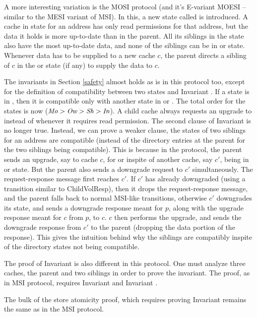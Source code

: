 A more interesting variation is the MOSI protocol (and it's E-variant MOESI --
similar to the MESI variant of MSI). In this, a new state called \Ow{} is
introduced. A cache in \Ow{} state for an address has only read permissions for
that address, but the data it holds is more up-to-date than in the parent.
All its siblings in the \Sh{} state also have the most up-to-date data, and
none of the siblings can be in \Mo{} or \Ow{} state.
Whenever data has to be supplied to a new cache $c$, the parent directs a
sibling of $c$ in the \Ow{} or \Mo{} state (if any) to supply the data to $c$.

The invariants in Section \ref{safety} almost holds as is in this protocol too,
except for the definition of compatibility between two states and Invariant
. If a state is in \Ow{}, then it is compatible only
with another state in \Sh{} or \In{}. The total order for the states is now
($\textit{Mo} > \textit{Ow} > \textit{Sh} > \textit{In}$). A child cache always requests an upgrade to \Ow{}
instead of \Sh{} whenever it requires read permission. The second clause of
Invariant  is no longer true. Instead, we can prove
a weaker clause, \viz the states of two siblings for an address are compatible
(instead of the directory entries at the parent for the two siblings being
compatible).  This is because in the protocol, the parent sends an upgrade, say
to cache $c$, for \Ow{} or \Mo{} inspite of another cache, say $c'$, being in
\Ow{} or \Mo{} state. But the parent also sends a downgrade request to $c'$
simultaneously. The request-response message first reaches $c'$. If $c'$ has
already downgraded (using a transition similar to ChildVolResp), then it drops
the request-response message, and the parent falls back to normal MSI-like
transitions, otherwise $c'$ downgrades its state, and sends a downgrade
response meant for $p$, along with the upgrade response meant for $c$ from $p$, to $c$.
$c$ then performs the upgrade, and sends the downgrade response from $c'$ to
the parent (dropping the data portion of the response). This gives the intuition behind why the siblings are compatibly
inspite of the directory states not being compatible.

The proof of Invariant  is also different in this
protocol. One must analyze three caches, the parent and two siblings in order
to prove the invariant. The proof, as in MSI protocol, requires Invariant
 and Invariant .

The bulk of the store atomicity proof, which requires proving Invariant
 remains the same as in the MSI protocol.
